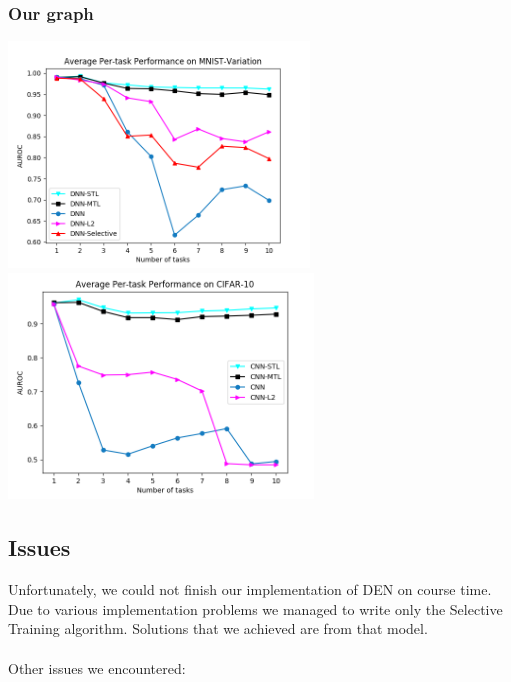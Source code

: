 \documentclass[12pt]{article}
\begin{document}
    \subsubsection{Our graph}
    \includegraphics[height=6cm]{fig1-v3.png}
    \includegraphics[height=6cm]{fig1-s.png}

    \subsection{Issues}

    Unfortunately, we could not finish our implementation of DEN on course time. Due to various implementation
    problems we managed to write only the Selective Training algorithm. Solutions that we achieved are
    from that model.
    \\
    \\
    Other issues we encountered:
\end{document}
